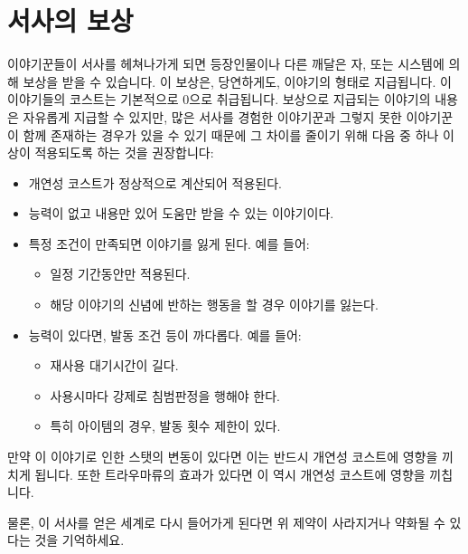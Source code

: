 \documentclass{report}
\begin{document}
	\hypertarget{reward}{}
	\section*{서사의 보상}
	이야기꾼들이 서사를 헤쳐나가게 되면 등장인물이나 다른 깨달은 자, 또는 시스템에 의해 보상을 받을 수 있습니다. 이 보상은, 당연하게도, 이야기의 형태로 지급됩니다. 이 이야기들의 코스트는 기본적으로 0으로 취급됩니다. 보상으로 지급되는 이야기의 내용은 자유롭게 지급할 수 있지만, 많은 서사를 경험한 이야기꾼과 그렇지 못한 이야기꾼이 함께 존재하는 경우가 있을 수 있기 때문에 그 차이를 줄이기 위해 다음 중 하나 이상이 적용되도록 하는 것을 권장합니다:
	\begin{itemize}
		\item 개연성 코스트가 정상적으로 계산되어 적용된다.
		\item 능력이 없고 내용만 있어 도움만 받을 수 있는 이야기이다.
		\item 특정 조건이 만족되면 이야기를 잃게 된다. 예를 들어:
		\begin{itemize}
			\item 일정 기간동안만 적용된다.
			\item 해당 이야기의 신념에 반하는 행동을 할 경우 이야기를 잃는다.
		\end{itemize}
		\item 능력이 있다면, 발동 조건 등이 까다롭다. 예를 들어:
		\begin{itemize}
			\item 재사용 대기시간이 길다.
			\item 사용시마다 강제로 침범판정을 행해야 한다.
			\item 특히 아이템의 경우, 발동 횟수 제한이 있다.
		\end{itemize}
	\end{itemize}
	만약 이 이야기로 인한 스탯의 변동이 있다면 이는 반드시 개연성 코스트에 영향을 끼치게 됩니다. 또한 트라우마류의 효과가 있다면 이 역시 개연성 코스트에 영향을 끼칩니다.
	
	물론, 이 서사를 얻은 세계로 다시 들어가게 된다면 위 제약이 사라지거나 약화될 수 있다는 것을 기억하세요.
	
\end{document}
